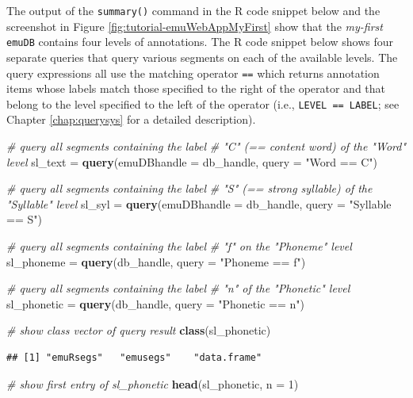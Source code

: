 \documentclass[]{book}
\newenvironment{Shaded}{\begin{snugshade}}{\end{snugshade}}
\newcommand{\CommentTok}[1]{\textcolor[rgb]{0.56,0.35,0.01}{\textit{#1}}}
\newcommand{\DataTypeTok}[1]{\textcolor[rgb]{0.13,0.29,0.53}{#1}}
\newcommand{\DecValTok}[1]{\textcolor[rgb]{0.00,0.00,0.81}{#1}}
\newcommand{\KeywordTok}[1]{\textcolor[rgb]{0.13,0.29,0.53}{\textbf{#1}}}
\newcommand{\NormalTok}[1]{#1}
\newcommand{\StringTok}[1]{\textcolor[rgb]{0.31,0.60,0.02}{#1}}
\begin{document}
The output of the \texttt{summary()} command in the R code snippet below and the screenshot in Figure \ref{fig:tutorial-emuWebAppMyFirst} show that the \emph{my-first} \texttt{emuDB} contains four levels of annotations. The R code snippet below shows four separate queries that query various segments on each of the available levels. The query expressions all use the matching operator \texttt{==} which returns annotation items whose labels match those specified to the right of the operator and that belong to the level specified to the left of the operator (i.e., \texttt{LEVEL\ ==\ LABEL}; see Chapter \ref{chap:querysys} for a detailed description).

\begin{Shaded}
\begin{Highlighting}[]
\CommentTok{# query all segments containing the label}
\CommentTok{# "C" (== content word) of the "Word" level}
\NormalTok{sl_text =}\StringTok{ }\KeywordTok{query}\NormalTok{(}\DataTypeTok{emuDBhandle =}\NormalTok{ db_handle,}
                \DataTypeTok{query =} \StringTok{"Word == C"}\NormalTok{)}

\CommentTok{# query all segments containing the label}
\CommentTok{# "S" (== strong syllable) of the "Syllable" level}
\NormalTok{sl_syl =}\StringTok{ }\KeywordTok{query}\NormalTok{(}\DataTypeTok{emuDBhandle =}\NormalTok{ db_handle,}
               \DataTypeTok{query =} \StringTok{"Syllable == S"}\NormalTok{)}

\CommentTok{# query all segments containing the label}
\CommentTok{# "f" on the "Phoneme" level}
\NormalTok{sl_phoneme =}\StringTok{ }\KeywordTok{query}\NormalTok{(db_handle,}
                   \DataTypeTok{query =} \StringTok{"Phoneme == f"}\NormalTok{)}

\CommentTok{# query all segments containing the label}
\CommentTok{# "n" of the "Phonetic" level}
\NormalTok{sl_phonetic =}\StringTok{ }\KeywordTok{query}\NormalTok{(db_handle,}
                    \DataTypeTok{query =} \StringTok{"Phonetic == n"}\NormalTok{)}

\CommentTok{# show class vector of query result}
\KeywordTok{class}\NormalTok{(sl_phonetic)}
\end{Highlighting}
\end{Shaded}

\begin{verbatim}
## [1] "emuRsegs"   "emusegs"    "data.frame"
\end{verbatim}

\begin{Shaded}
\begin{Highlighting}[]
\CommentTok{# show first entry of sl_phonetic}
\KeywordTok{head}\NormalTok{(sl_phonetic, }\DataTypeTok{n =} \DecValTok{1}\NormalTok{)}
\end{Highlighting}
\end{Shaded}
\end{document}

